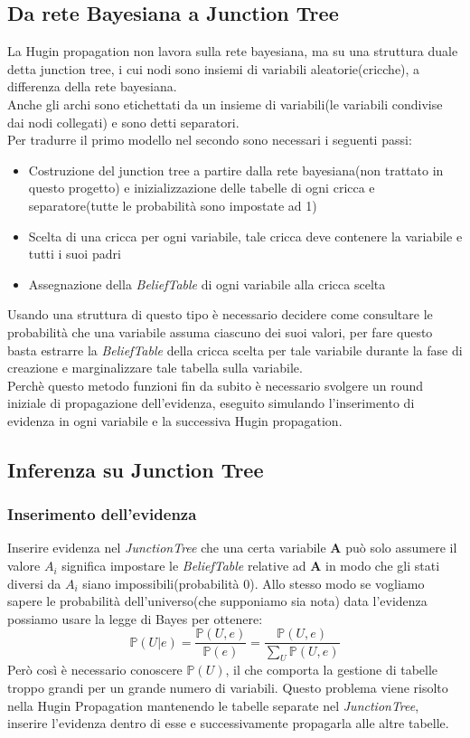 \documentclass[a4paper]{article}
\begin{document}
\subsection{Da rete Bayesiana a Junction Tree}
La Hugin propagation non lavora sulla rete bayesiana, ma su una struttura duale detta junction tree, i cui nodi sono insiemi di variabili aleatorie(cricche), a differenza della rete bayesiana.\\ 
Anche gli archi sono etichettati da un insieme di variabili(le variabili condivise dai nodi collegati) e sono detti separatori.\\
Per tradurre il primo modello nel secondo sono necessari i seguenti passi:
\begin{itemize}
\item Costruzione del junction tree a partire dalla rete bayesiana(non trattato in questo progetto) e inizializzazione delle tabelle di ogni cricca e separatore(tutte le probabilità sono impostate ad 1)
\item Scelta di una cricca per ogni variabile, tale cricca deve contenere la variabile e tutti i suoi padri
\item Assegnazione della \emph{BeliefTable} di ogni variabile alla cricca scelta
\end{itemize}
Usando una struttura di questo tipo è necessario decidere come consultare le probabilità che una variabile assuma ciascuno dei suoi valori, per fare questo basta estrarre la \emph{BeliefTable} della cricca scelta per tale variabile durante la fase di creazione e marginalizzare tale tabella sulla variabile.\\
Perchè questo metodo funzioni fin da subito è necessario svolgere un round iniziale di  propagazione dell'evidenza, eseguito simulando l'inserimento di evidenza in ogni variabile e la successiva Hugin propagation.
\subsection{Inferenza su Junction Tree}
\subsubsection{Inserimento dell'evidenza}
Inserire evidenza nel \emph{JunctionTree} che una certa variabile \textbf{A} può solo assumere il valore $A_i$ significa impostare le \emph{BeliefTable} relative ad \textbf{A} in modo che gli stati diversi da $A_i$ siano impossibili(probabilità 0). Allo stesso modo se vogliamo sapere le probabilità dell'universo(che supponiamo sia nota) data l'evidenza possiamo usare la legge di Bayes per ottenere:
$$ \mathbb{P}(U|e)= \frac{\mathbb{P}(U,e)}{\mathbb{P}(e)}=\frac{\mathbb{P}(U,e)}{\sum_U \mathbb{P}(U,e)}$$
Però così è necessario conoscere $\mathbb{P}(U)$, il che comporta la gestione di tabelle troppo grandi per un grande numero di variabili. Questo problema viene risolto nella Hugin Propagation mantenendo le tabelle separate nel \emph{JunctionTree}, inserire l'evidenza dentro di esse e successivamente propagarla alle altre tabelle. 
\end{document}
